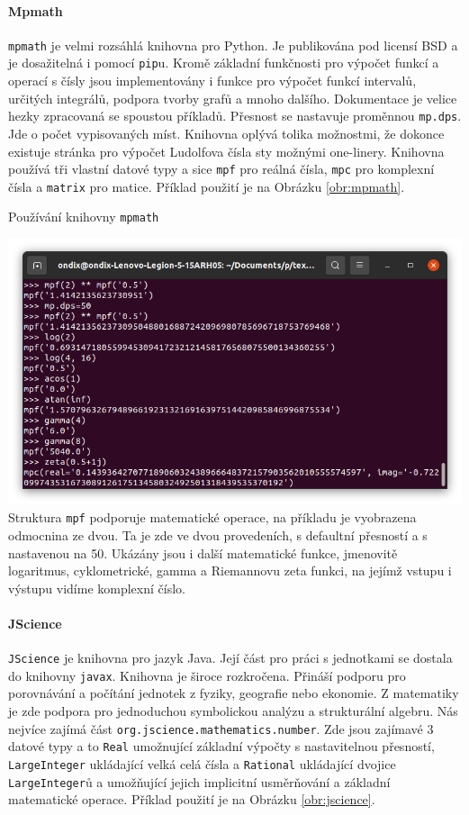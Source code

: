 \paragraph{Mpmath \cite{mpmath}}
\texttt{mpmath} je velmi rozsáhlá knihovna pro Python. Je publikována pod licensí BSD a je dosažitelná i pomocí \texttt{pip}u. Kromě základní funkčnosti pro výpočet funkcí a operací s čísly jsou implementovány i funkce pro výpočet funkcí intervalů, určitých integrálů, podpora tvorby grafů a mnoho dalšího. Dokumentace je velice hezky zpracovaná se spoustou příkladů. Přesnost se nastavuje proměnnou \texttt{mp.dps}. Jde o počet vypisovaných míst. Knihovna oplývá tolika možnostmi, že dokonce existuje stránka pro výpočet Ludolfova čísla sty možnými one-linery. Knihovna používá tři vlastní datové typy a sice \texttt{mpf} pro reálná čísla, \texttt{mpc} pro komplexní čísla a \texttt{matrix} pro matice. Příklad použití je na Obrázku \ref{obr:mpmath}.

\begin{myfigure}{}
\caption{Používání knihovny \texttt{mpmath}}
\includegraphics[width=\linewidth]{./graphics/mpmath.png}\label{obr:mpmath}
Struktura \texttt{mpf} podporuje matematické operace, na příkladu je vyobrazena odmocnina ze dvou. Ta je zde ve dvou provedeních, s defaultní přesností a s nastavenou na 50. Ukázány jsou i další matematické funkce, jmenovitě logaritmus, cyklometrické, gamma a Riemannovu zeta funkci, na jejímž vstupu i výstupu vidíme komplexní číslo.
\end{myfigure}

\paragraph{JScience \cite{jscience}}
\texttt{JScience} je knihovna pro jazyk Java. Její část pro práci s jednotkami se dostala do knihovny \texttt{javax}. Knihovna je široce rozkročena. Přináší podporu pro porovnávání a počítání jednotek z fyziky, geografie nebo ekonomie. Z matematiky je zde podpora pro jednoduchou symbolickou analýzu a strukturální algebru. Nás nejvíce zajímá část \texttt{org.jscience.mathematics.number}. Zde jsou zajímavé 3 datové typy a to \texttt{Real} umožnující základní výpočty s nastavitelnou přesností, \texttt{LargeInteger} ukládající velká celá čísla a \texttt{Rational} ukládající dvojice \texttt{LargeInteger}ů a umožňující jejich implicitní usměrňování a základní matematické operace. Příklad použití je na Obrázku \ref{obr:jscience}.

